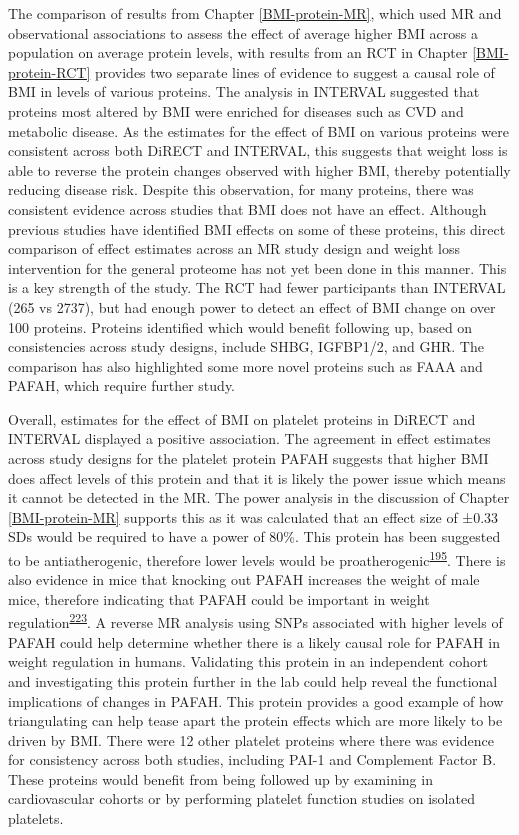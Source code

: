 \documentclass[11pt,twoside]{bristolthesis}
\begin{document}
The comparison of results from Chapter \ref{BMI-protein-MR}, which used MR and observational associations to assess the effect of average higher BMI across a population on average protein levels, with results from an RCT in Chapter \ref{BMI-protein-RCT} provides two separate lines of evidence to suggest a causal role of BMI in levels of various proteins. The analysis in INTERVAL suggested that proteins most altered by BMI were enriched for diseases such as CVD and metabolic disease. As the estimates for the effect of BMI on various proteins were consistent across both DiRECT and INTERVAL, this suggests that weight loss is able to reverse the protein changes observed with higher BMI, thereby potentially reducing disease risk. Despite this observation, for many proteins, there was consistent evidence across studies that BMI does not have an effect. Although previous studies have identified BMI effects on some of these proteins, this direct comparison of effect estimates across an MR study design and weight loss intervention for the general proteome has not yet been done in this manner. This is a key strength of the study. The RCT had fewer participants than INTERVAL (265 vs 2737), but had enough power to detect an effect of BMI change on over 100 proteins. Proteins identified which would benefit following up, based on consistencies across study designs, include SHBG, IGFBP1/2, and GHR. The comparison has also highlighted some more novel proteins such as FAAA and PAFAH, which require further study.

Overall, estimates for the effect of BMI on platelet proteins in DiRECT and INTERVAL displayed a positive association. The agreement in effect estimates across study designs for the platelet protein PAFAH suggests that higher BMI does affect levels of this protein and that it is likely the power issue which means it cannot be detected in the MR. The power analysis in the discussion of Chapter \ref{BMI-protein-MR} supports this as it was calculated that an effect size of ±0.33 SDs would be required to have a power of 80\%. This protein has been suggested to be antiatherogenic, therefore lower levels would be proatherogenic\textsuperscript{\protect\hyperlink{ref-Noto2003}{195}}. There is also evidence in mice that knocking out PAFAH increases the weight of male mice, therefore indicating that PAFAH could be important in weight regulation\textsuperscript{\protect\hyperlink{ref-Nakamura2021}{223}}. A reverse MR analysis using SNPs associated with higher levels of PAFAH could help determine whether there is a likely causal role for PAFAH in weight regulation in humans. Validating this protein in an independent cohort and investigating this protein further in the lab could help reveal the functional implications of changes in PAFAH. This protein provides a good example of how triangulating can help tease apart the protein effects which are more likely to be driven by BMI. There were 12 other platelet proteins where there was evidence for consistency across both studies, including PAI-1 and Complement Factor B. These proteins would benefit from being followed up by examining in cardiovascular cohorts or by performing platelet function studies on isolated platelets.
\end{document}
